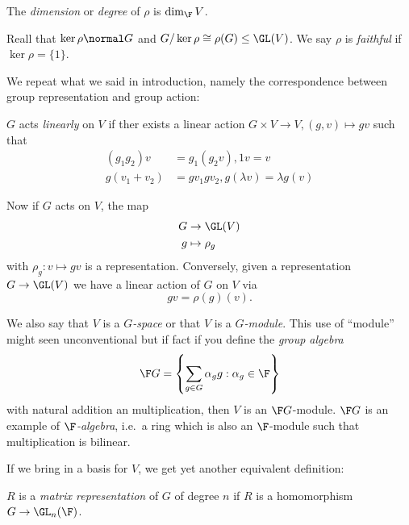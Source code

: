 \documentclass[a4paper]{article}
\theoremstyle{definition}
\begin{document}
The \emph{dimension} or \emph{degree} of \(\rho\) is \(\dim_\F V\).

Reall that \(\ker \rho \normal G\) and \(G / \ker \rho \cong \rho(G) \leq \GL(V)\). We say \(\rho\) is \emph{faithful} if \(\ker \rho = \{1\}\).

We repeat what we said in introduction, namely the correspondence between group representation and group action:

\begin{definition}
  \(G\) acts \emph{linearly} on \(V\) if ther exists a linear action \(G \times V \to V, (g, v) \mapsto gv\) such that
  \begin{align*}
    (g_1g_2) v &= g_1(g_2v), 1 v = v \\
    g(v_1 + v_2) &= gv_1 gv_2, g(\lambda v) = \lambda g(v)
  \end{align*}
\end{definition}

Now if \(G\) acts on \(V\), the map
\begin{align*}
  G &\to \GL(V) \\
  g &\mapsto \rho_g
\end{align*}
with \(\rho_g: v \mapsto gv\) is a representation. Conversely, given a representation \(G \to \GL(V)\) we have a linear action of \(G\) on \(V\) via
\[
  gv = \rho(g)(v).
\]

\begin{remark}
  We also say that \(V\) is a \emph{\(G\)-space} or that \(V\) is a \emph{\(G\)-module}. This use of ``module'' might seen unconventional but if fact if you define the \emph{group algebra}
  \[
    \F G = \left\{ \sum_{g\in G} \alpha_g g: \alpha_g \in \F \right\}
  \]
  with natural addition an multiplication, then \(V\) is an \(\F G\)-module. \(\F G\) is an example of \emph{\(\F\)-algebra}, i.e.\ a ring which is also an \(\F\)-module such that multiplication is bilinear.
\end{remark}

If we bring in a basis for \(V\), we get yet another equivalent definition:

\begin{definition}
  \(R\) is a \emph{matrix representation} of \(G\) of degree \(n\) if \(R\) is a homomorphism \(G \to \GL_n(\F)\).
\end{definition}
\end{document}
